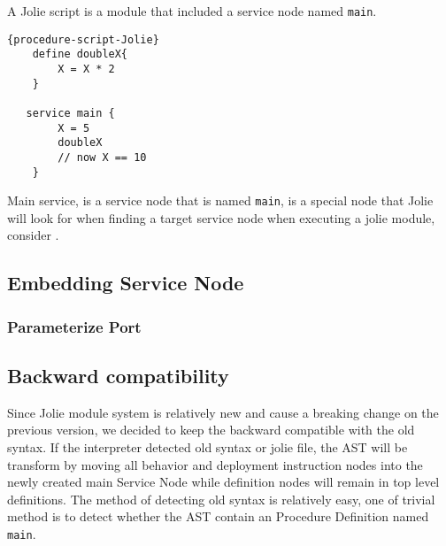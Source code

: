 A Jolie script is a module that included a service node named \texttt{main}.

\begin{listing}[h]
    \lstset{language=Jolie,
        style=codeStyle
    }
    \begin{lstlisting}[frame=tlrb, caption= {A Jolie script version of ~\ref{list:procedure}}, label={list:jolie-procedure-script}]{procedure-script-Jolie}
    define doubleX{
        X = X * 2
    }
    
   service main {
        X = 5
        doubleX
        // now X == 10
    }
    \end{lstlisting}
\end{listing}

Main service, is a service node that is named \texttt{main}, is a special node that Jolie will look for when finding a target service node when executing a jolie module, consider .

\subsection{Embedding Service Node}



\subsubsection{Parameterize Port}

\subsection{Backward compatibility}

Since Jolie module system is relatively new and cause a breaking change on the previous version, we decided to keep the backward compatible with the old syntax. If the interpreter detected old syntax or jolie file, the AST will be transform by moving all behavior and deployment instruction nodes into the newly created main Service Node while definition nodes will remain in top level definitions. The method of detecting old syntax is relatively easy, one of trivial method is to detect whether the AST contain an Procedure Definition named \texttt{main}.

